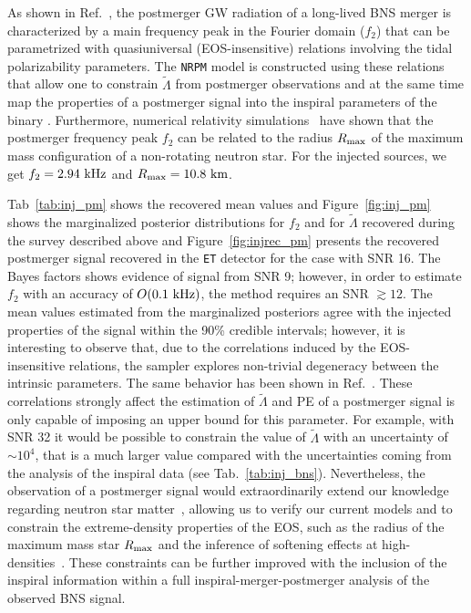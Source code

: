 \documentclass[prd,aps,twocolumn,a4paper,showkeys,nofootinbib,floatfix]{revtex4-1}
\def\tLam{{\tilde\Lambda}}
\begin{document}
As shown in Ref.~\cite{Bernuzzi:2015rla},
the postmerger GW radiation of a long-lived BNS merger
is characterized by a main frequency peak in the Fourier domain 
($f_2$) that can be parametrized with quasiuniversal
  (EOS-insensitive) relations involving the tidal polarizability
  parameters.
The {\tt NRPM} model is constructed using these relations that allow one to constrain $\tLam$ from
  postmerger observations and at the same time map the properties 
of a postmerger signal into the inspiral parameters of the binary \cite{Breschi:2019srl}.
Furthermore, numerical relativity simulations~\cite{Bauswein:2012ya,Breschi:2019srl} have shown that
the postmerger frequency peak $f_2$ can be related to the radius $R_{\rm max}$ of the 
maximum mass configuration of a non-rotating neutron star.
For the injected sources, 
we get $f_2 = 2.94~{\rm kHz}$ and $R_{\rm max} = 10.8~{\rm km}$.

Tab~\ref{tab:inj_pm} shows the recovered mean values and
Figure~\ref{fig:inj_pm} shows the marginalized posterior distributions 
for $f_2$ and for $\tLam$ recovered during the survey described above and
Figure~\ref{fig:injrec_pm} presents the recovered postmerger signal recovered 
in the {\tt ET} detector for the case with SNR 16.
The Bayes factors shows evidence of signal from SNR 9;
however, in order to estimate $f_2$ with an accuracy of $O(0.1~{\rm kHz})$,
the method requires an SNR ${\gtrsim}12$.
The mean values estimated from the 
marginalized posteriors agree with the injected properties of the signal 
within the 90\% credible intervals; however, 
it is interesting to observe that, due to the correlations induced by the 
EOS-insensitive relations, the sampler explores non-trivial degeneracy
between the intrinsic parameters.
The same behavior has been shown in Ref.~\cite{Breschi:2019srl}.
These correlations strongly affect the estimation of $\tLam$
and PE of a postmerger signal 
is only capable of imposing an upper bound for this parameter.
For example, with SNR 32 it would be possible 
to constrain the value of $\tLam$
with an uncertainty of ${\sim}10^4$,
that is a much larger value compared with the uncertainties coming 
from the analysis of the inspiral data (see Tab.~\ref{tab:inj_bns}).
Nevertheless, the observation of a postmerger signal
would extraordinarily extend our knowledge regarding 
neutron star matter~\cite{Bauswein:2014qla, Radice:2016rys, Agathos:2019sah},
allowing us to verify our current models and to constrain the extreme-density properties
of the EOS, such as the radius of the maximum mass star $R_{\rm max}$
and the inference of softening effects at high-densities~\cite{Bauswein:2018bma,Breschi:2019srl}.
These constraints can be further improved with the inclusion of the 
inspiral information within a full inspiral-merger-postmerger analysis of the 
observed BNS signal.
\end{document}
